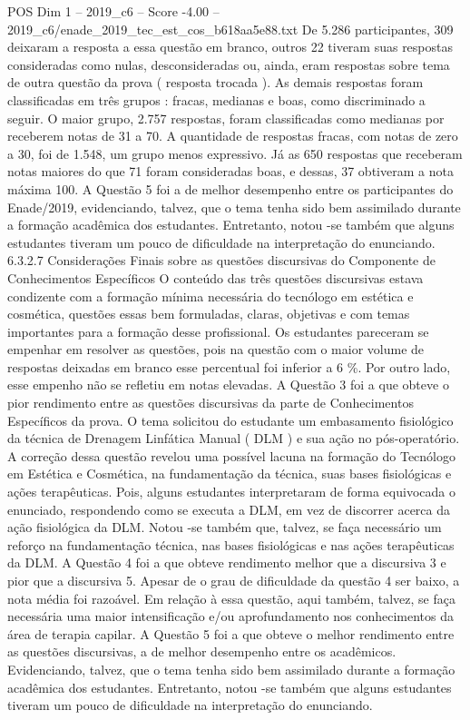 \begin{textsample}{POS Dim 1 – 2019\_c6 – Score -4.00 – 2019\_c6/enade\_2019\_tec\_est\_cos\_b618aa5e88.txt}
De 5.286 participantes, 309 deixaram a resposta a essa questão em branco, outros 22 tiveram suas respostas consideradas como nulas, desconsideradas ou, ainda, eram respostas sobre tema de outra questão da prova ( resposta trocada ).
As demais respostas foram classificadas em três grupos : fracas, medianas e boas, como discriminado a seguir.
O maior grupo, 2.757 respostas, foram classificadas como medianas por receberem notas de 31 a 70.
A quantidade de respostas fracas, com notas de zero a 30, foi de 1.548, um grupo menos expressivo.
Já as 650 respostas que receberam notas maiores do que 71 foram consideradas boas, e dessas, 37 obtiveram a nota máxima 100.
A Questão 5 foi a de melhor desempenho entre os participantes do Enade/2019, evidenciando, talvez, que o tema tenha sido bem assimilado durante a formação acadêmica dos estudantes.
Entretanto, notou -se também que alguns estudantes tiveram um pouco de dificuldade na interpretação do enunciando. 6.3.2.7 Considerações Finais sobre as questões discursivas do Componente de Conhecimentos Específicos O conteúdo das três questões discursivas estava condizente com a formação mínima necessária do tecnólogo em estética e cosmética, questões essas bem formuladas, claras, objetivas e com temas importantes para a formação desse profissional.
Os estudantes pareceram se empenhar em resolver as questões, pois na questão com o maior volume de respostas deixadas em branco esse percentual foi inferior a 6 \%.
Por outro lado, esse empenho não se refletiu em notas elevadas.
A Questão 3 foi a que obteve o pior rendimento entre as questões discursivas da parte de Conhecimentos Específicos da prova.
O tema solicitou do estudante um embasamento fisiológico da técnica de Drenagem Linfática Manual ( DLM ) e sua ação no pós-operatório.
A correção dessa questão revelou uma possível lacuna na formação do Tecnólogo em Estética e Cosmética, na fundamentação da técnica, suas bases fisiológicas e ações terapêuticas.
Pois, alguns estudantes interpretaram de forma equivocada o enunciado, respondendo como se executa a DLM, em vez de discorrer acerca da ação fisiológica da DLM.
Notou -se também que, talvez, se faça necessário um reforço na fundamentação técnica, nas bases fisiológicas e nas ações terapêuticas da DLM.
A Questão 4 foi a que obteve rendimento melhor que a discursiva 3 e pior que a discursiva 5.
Apesar de o grau de dificuldade da questão 4 ser baixo, a nota média foi razoável.
Em relação à essa questão, aqui também, talvez, se faça necessária uma maior intensificação e/ou aprofundamento nos conhecimentos da área de terapia capilar.
A Questão 5 foi a que obteve o melhor rendimento entre as questões discursivas, a de melhor desempenho entre os acadêmicos.
Evidenciando, talvez, que o tema tenha sido bem assimilado durante a formação acadêmica dos estudantes.
Entretanto, notou -se também que alguns estudantes tiveram um pouco de dificuldade na interpretação do enunciando.

\end{textsample}
